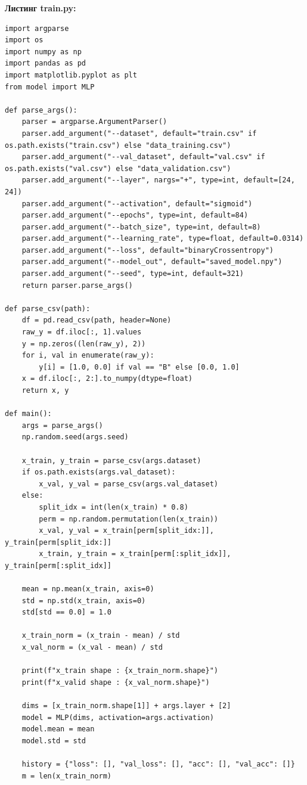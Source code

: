 \documentclass[a4paper,14pt]{extarticle}
\begin{document}
\newpage
\textbf{Листинг train.py:}
\begin{lstlisting}
import argparse
import os
import numpy as np
import pandas as pd
import matplotlib.pyplot as plt
from model import MLP

def parse_args():
    parser = argparse.ArgumentParser()
    parser.add_argument("--dataset", default="train.csv" if os.path.exists("train.csv") else "data_training.csv")
    parser.add_argument("--val_dataset", default="val.csv" if os.path.exists("val.csv") else "data_validation.csv")
    parser.add_argument("--layer", nargs="+", type=int, default=[24, 24])
    parser.add_argument("--activation", default="sigmoid")
    parser.add_argument("--epochs", type=int, default=84)
    parser.add_argument("--batch_size", type=int, default=8)
    parser.add_argument("--learning_rate", type=float, default=0.0314)
    parser.add_argument("--loss", default="binaryCrossentropy")
    parser.add_argument("--model_out", default="saved_model.npy")
    parser.add_argument("--seed", type=int, default=321)
    return parser.parse_args()

def parse_csv(path):
    df = pd.read_csv(path, header=None)
    raw_y = df.iloc[:, 1].values
    y = np.zeros((len(raw_y), 2))
    for i, val in enumerate(raw_y):
        y[i] = [1.0, 0.0] if val == "B" else [0.0, 1.0]
    x = df.iloc[:, 2:].to_numpy(dtype=float)
    return x, y

def main():
    args = parse_args()
    np.random.seed(args.seed)

    x_train, y_train = parse_csv(args.dataset)
    if os.path.exists(args.val_dataset):
        x_val, y_val = parse_csv(args.val_dataset)
    else:
        split_idx = int(len(x_train) * 0.8)
        perm = np.random.permutation(len(x_train))
        x_val, y_val = x_train[perm[split_idx:]], y_train[perm[split_idx:]]
        x_train, y_train = x_train[perm[:split_idx]], y_train[perm[:split_idx]]

    mean = np.mean(x_train, axis=0)
    std = np.std(x_train, axis=0)
    std[std == 0.0] = 1.0

    x_train_norm = (x_train - mean) / std
    x_val_norm = (x_val - mean) / std

    print(f"x_train shape : {x_train_norm.shape}")
    print(f"x_valid shape : {x_val_norm.shape}")

    dims = [x_train_norm.shape[1]] + args.layer + [2]
    model = MLP(dims, activation=args.activation)
    model.mean = mean
    model.std = std

    history = {"loss": [], "val_loss": [], "acc": [], "val_acc": []}
    m = len(x_train_norm)


\end{lstlisting}
\end{document}
